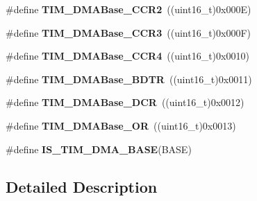 \begin{DoxyCompactItemize}
\item 
\hypertarget{group___t_i_m___d_m_a___base__address_ga0e2150dcd3afe31ecb793aa471b3b972}{\#define {\bfseries T\-I\-M\-\_\-\-D\-M\-A\-Base\-\_\-\-C\-C\-R2}~((uint16\-\_\-t)0x000\-E)}\label{group___t_i_m___d_m_a___base__address_ga0e2150dcd3afe31ecb793aa471b3b972}

\item 
\hypertarget{group___t_i_m___d_m_a___base__address_ga590c90085bd2b206b941dff2731fed74}{\#define {\bfseries T\-I\-M\-\_\-\-D\-M\-A\-Base\-\_\-\-C\-C\-R3}~((uint16\-\_\-t)0x000\-F)}\label{group___t_i_m___d_m_a___base__address_ga590c90085bd2b206b941dff2731fed74}

\item 
\hypertarget{group___t_i_m___d_m_a___base__address_ga5e84a16e7d8ea369a3a55bb6fe1f2171}{\#define {\bfseries T\-I\-M\-\_\-\-D\-M\-A\-Base\-\_\-\-C\-C\-R4}~((uint16\-\_\-t)0x0010)}\label{group___t_i_m___d_m_a___base__address_ga5e84a16e7d8ea369a3a55bb6fe1f2171}

\item 
\hypertarget{group___t_i_m___d_m_a___base__address_gaaff22bbf3091c47783c1c68b648c8605}{\#define {\bfseries T\-I\-M\-\_\-\-D\-M\-A\-Base\-\_\-\-B\-D\-T\-R}~((uint16\-\_\-t)0x0011)}\label{group___t_i_m___d_m_a___base__address_gaaff22bbf3091c47783c1c68b648c8605}

\item 
\hypertarget{group___t_i_m___d_m_a___base__address_ga59e2206e4e03b9d55c9fb5a24e29b01c}{\#define {\bfseries T\-I\-M\-\_\-\-D\-M\-A\-Base\-\_\-\-D\-C\-R}~((uint16\-\_\-t)0x0012)}\label{group___t_i_m___d_m_a___base__address_ga59e2206e4e03b9d55c9fb5a24e29b01c}

\item 
\hypertarget{group___t_i_m___d_m_a___base__address_gad6a75d19df73bae091a0e649fba7339c}{\#define {\bfseries T\-I\-M\-\_\-\-D\-M\-A\-Base\-\_\-\-O\-R}~((uint16\-\_\-t)0x0013)}\label{group___t_i_m___d_m_a___base__address_gad6a75d19df73bae091a0e649fba7339c}

\item 
\#define {\bfseries I\-S\-\_\-\-T\-I\-M\-\_\-\-D\-M\-A\-\_\-\-B\-A\-S\-E}(B\-A\-S\-E)
\end{DoxyCompactItemize}


\subsection{Detailed Description}


